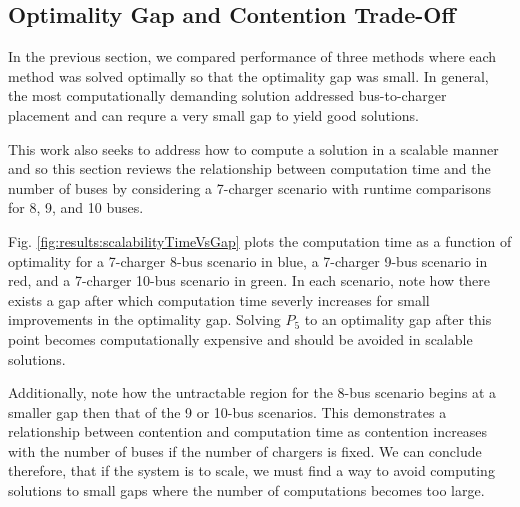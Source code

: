 \subsection{Optimality Gap and Contention Trade-Off}
In the previous section, we compared performance of three methods where each method was solved optimally so that the optimality gap was small. In general, the most computationally demanding solution addressed bus-to-charger placement and can requre a very small gap to yield good solutions. 
\par This work also seeks to address how to compute a solution in a scalable manner and so this section reviews the relationship between computation time and the number of buses by considering a 7-charger scenario with runtime comparisons for 8, 9, and 10 buses. 
\par Fig. \ref{fig:results:scalabilityTimeVsGap} plots the computation time as a function of optimality for a 7-charger 8-bus scenario in blue, a 7-charger 9-bus scenario in red, and a 7-charger 10-bus scenario in green. In each scenario, note how there exists a gap after which computation time severly increases for small improvements in the optimality gap. Solving $P_5$ to an optimality gap after this point becomes computationally expensive and should be avoided in scalable solutions. 
\par Additionally, note how the untractable region for the 8-bus scenario begins at a smaller gap then that of the 9 or 10-bus scenarios. This demonstrates a relationship between contention and computation time as contention increases with the number of buses if the number of chargers is fixed. We can conclude therefore, that if the system is to scale, we must find a way to avoid computing solutions to small gaps where the number of computations becomes too large.

 

